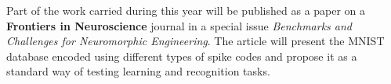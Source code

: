 Part of the work carried during this year will be published as a paper on a 
\textbf{Frontiers in Neuroscience} journal in a special issue \emph{Benchmarks 
and Challenges for Neuromorphic Engineering}. The article will present the MNIST
database encoded using different types of spike codes and propose it as a
standard way of testing learning and recognition tasks.